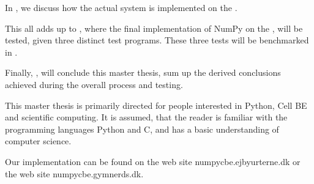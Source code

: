 In , we
discuss how the actual system is implemented on the \CBE{}.

This all adds up to , where the final
implementation of NumPy on the \CBE{}, will be tested, given three
distinct test programs. These three tests will be benchmarked
in .


Finally, , will conclude this master
thesis, sum up the derived conclusions achieved during the overall
process and testing.

This master thesis is primarily directed for people interested in
Python, Cell BE and scientific computing. It is assumed, that the
reader is familiar with the programming languages Python and C, and
has a basic understanding of computer science.

Our implementation can be found on the web site
numpycbe.ejbyurterne.dk or the web site numpycbe.gymnerds.dk.



